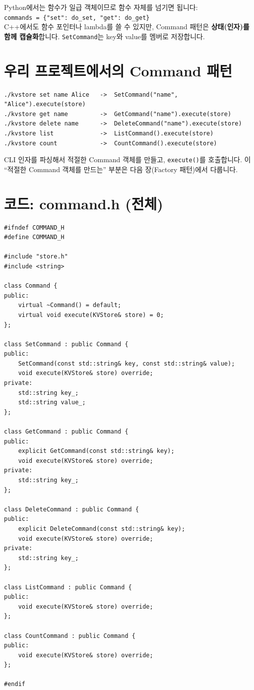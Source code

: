 \documentclass[11pt,a4paper]{book}
\newcommand{\file}[1]{\texttt{#1}}
\newcommand{\code}[1]{\texttt{#1}}
\begin{document}
\begin{pythonbox}
Python에서는 함수가 일급 객체이므로 함수 자체를 넘기면 됩니다:\\
\code{commands = \{"set": do\_set, "get": do\_get\}}\\[6pt]
C++에서도 함수 포인터나 lambda를 쓸 수 있지만, Command 패턴은 \textbf{상태(인자)를 함께 캡슐화}합니다. \code{SetCommand}는 key와 value를 멤버로 저장합니다.
\end{pythonbox}

\section{우리 프로젝트에서의 Command 패턴}

\begin{lstlisting}[style=shell,numbers=none]
./kvstore set name Alice   ->  SetCommand("name", "Alice").execute(store)
./kvstore get name         ->  GetCommand("name").execute(store)
./kvstore delete name      ->  DeleteCommand("name").execute(store)
./kvstore list             ->  ListCommand().execute(store)
./kvstore count            ->  CountCommand().execute(store)
\end{lstlisting}

CLI 인자를 파싱해서 적절한 Command 객체를 만들고, \code{execute()}를 호출합니다. 이 ``적절한 Command 객체를 만드는'' 부분은 다음 장(Factory 패턴)에서 다룹니다.

\section{코드: command.h (전체)}

\begin{lstlisting}[style=cpp,title={\file{src/command.h} (전체)}]
#ifndef COMMAND_H
#define COMMAND_H

#include "store.h"
#include <string>

class Command {
public:
    virtual ~Command() = default;
    virtual void execute(KVStore& store) = 0;
};

class SetCommand : public Command {
public:
    SetCommand(const std::string& key, const std::string& value);
    void execute(KVStore& store) override;
private:
    std::string key_;
    std::string value_;
};

class GetCommand : public Command {
public:
    explicit GetCommand(const std::string& key);
    void execute(KVStore& store) override;
private:
    std::string key_;
};

class DeleteCommand : public Command {
public:
    explicit DeleteCommand(const std::string& key);
    void execute(KVStore& store) override;
private:
    std::string key_;
};

class ListCommand : public Command {
public:
    void execute(KVStore& store) override;
};

class CountCommand : public Command {
public:
    void execute(KVStore& store) override;
};

#endif
\end{lstlisting}
\end{document}
